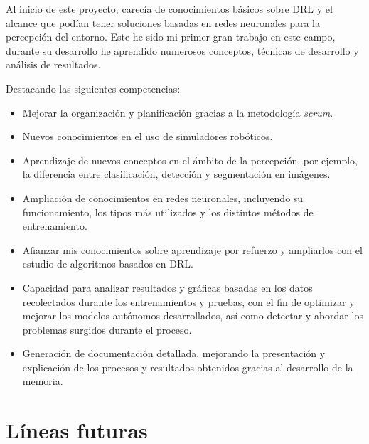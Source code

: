 Al inicio de este proyecto, carecía de conocimientos básicos sobre \ac{DRL} y el alcance que podían tener soluciones basadas en redes neuronales para la percepción del entorno. Este he sido mi primer gran trabajo en este campo, durante su desarrollo he aprendido numerosos conceptos, técnicas de desarrollo y análisis de resultados.

Destacando las siguientes competencias:

\begin{itemize}
\item Mejorar la organización y planificación gracias a la metodología \textit{scrum}.
\item Nuevos conocimientos en el uso de simuladores robóticos.
\item Aprendizaje de nuevos conceptos en el ámbito de la percepción, por ejemplo, la diferencia entre clasificación, detección y segmentación en imágenes.
\item Ampliación de conocimientos en redes neuronales, incluyendo su funcionamiento, los tipos más utilizados y los distintos métodos de entrenamiento.
\item Afianzar mis conocimientos sobre aprendizaje por refuerzo y ampliarlos con el estudio de algoritmos basados en \ac{DRL}.
\item Capacidad para analizar resultados y gráficas basadas en los datos recolectados durante los entrenamientos y pruebas, con el fin de optimizar y mejorar los modelos autónomos desarrollados, así como detectar y abordar los problemas surgidos durante el proceso.
\item Generación de documentación detallada, mejorando la presentación y explicación de los procesos y resultados obtenidos gracias al desarrollo de la memoria.
\end{itemize}

\section{Líneas futuras}

